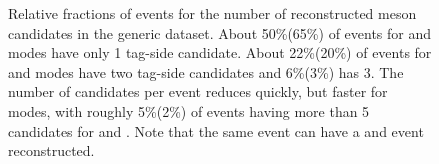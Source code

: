 \begin{figure}[htbp!]
    \centering
    \caption{\label{fig:fei_tag_reco_candidates} Relative fractions of events for the number of reconstructed \B meson candidates in the generic \MC dataset.
    About 50\%(65\%) of events for \Bp and \Bz \FEI modes have only 1 tag-side candidate.
    About 22\%(20\%) of events for \Bp and \Bz \FEI modes have two tag-side candidates and 6\%(3\%) has 3.
    The number of candidates per event reduces quickly, but faster for \Bz modes, with roughly 5\%(2\%) of events having more than 5 candidates for \Bp and \Bz.
    Note that the same event can have a \Bp and \Bz event reconstructed.
    }
\end{figure}
